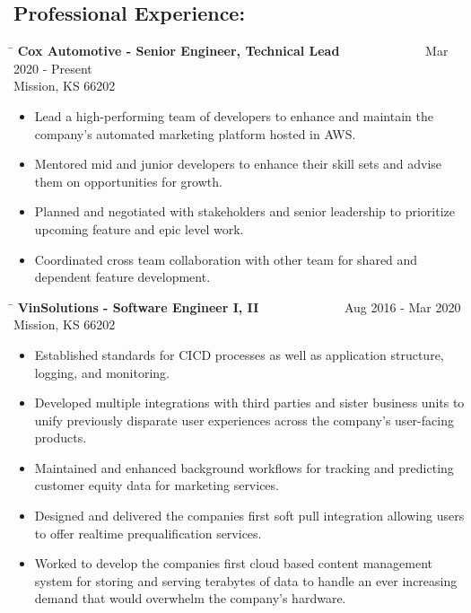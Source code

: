 \documentclass{res}
\begin{document}
\begin{resume}
\section{Professional Experience:}
   \vspace{-0.1in}
   \begin{tabbing}
	\hspace{5.5in}\= \kill 
	{\bf Cox Automotive - Senior Engineer, Technical Lead} \>~~~~~~~~~~~~~Mar 2020 - Present\\
	Mission, KS 66202
\end{tabbing}\vspace{-9pt}
\begin{itemize}
	\item Lead a high-performing team of developers to enhance and maintain the company’s automated marketing platform hosted in AWS.
	\item Mentored mid and junior developers to enhance their skill sets and advise them on opportunities for growth.
	\item Planned and negotiated with stakeholders and senior leadership to prioritize upcoming feature and epic level work.
	\item Coordinated cross team collaboration with other team for shared and dependent feature development.\vspace{-15pt}
\end{itemize}
   \begin{tabbing}
   \hspace{5.5in}\= \kill 
    {\bf VinSolutions - Software Engineer I, II} \>~~~~~~~~~~~~~Aug 2016 - Mar 2020\\
    Mission, KS 66202
   \end{tabbing}\vspace{-9pt}
	\begin{itemize}
		\item Established standards for CICD processes as well as application structure, logging, and monitoring.
		\item Developed multiple integrations with third parties and sister business units to unify previously disparate user experiences across the company's user-facing products.
		\item Maintained and enhanced background workflows for tracking and predicting customer equity data for marketing services.
		\item Designed and delivered the companies first soft pull integration allowing users to offer realtime prequalification services.
		\item Worked to develop the companies first cloud based content management system for storing and serving terabytes of data to handle an ever increasing demand that would overwhelm the company's hardware.

\end{itemize}
\end{resume}
\end{document}
